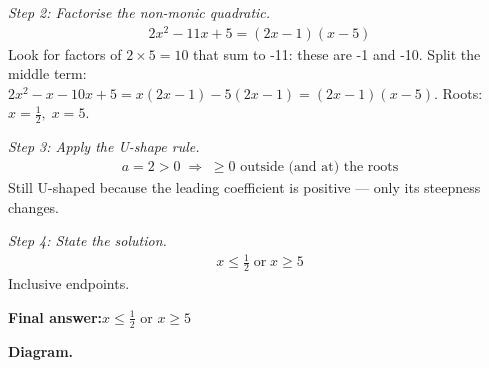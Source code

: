 \documentclass[11pt]{article}
\begin{document}
\textit{Step 2: Factorise the non-monic quadratic.}
\[\begin{gathered}
2x^2 - 11x + 5 = (2x - 1)(x - 5)
\end{gathered}\]
Look for factors of \( 2 \times 5 = 10 \) that sum to -11: these are -1 and -10. Split the middle term: \( 2x^2 - x - 10x + 5 = x(2x - 1) - 5(2x - 1) = (2x - 1)(x - 5) \). Roots: \( x = \tfrac{1}{2}, \; x = 5 \).

\textit{Step 3: Apply the U-shape rule.}
\[\begin{gathered}
a = 2 > 0 \;\Longrightarrow\; \geq 0 \text{ outside (and at) the roots}
\end{gathered}\]
Still U-shaped because the leading coefficient is positive --- only its steepness changes.

\textit{Step 4: State the solution.}
\[\begin{gathered}
x \leq \tfrac{1}{2} \;\text{or}\; x \geq 5
\end{gathered}\]
Inclusive endpoints.

\begin{answerbox}
\textbf{Final answer:}\quad \(\displaystyle x \leq \tfrac{1}{2}\) or \(\displaystyle x \geq 5\)
\end{answerbox}
\textbf{Diagram.}
\end{document}
